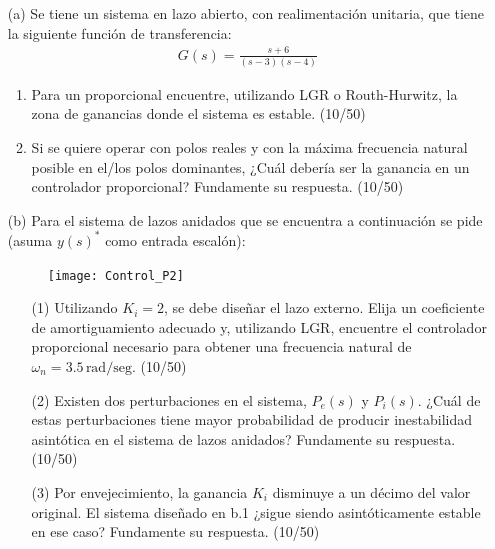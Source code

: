 \documentclass[
  11pt,
  letterpaper,
   addpoints,
  ]{exam}
\begin{document}
\begin{questions}
\begin{solution}
\end{solution}
    \question 
    \begin{itemize}
        \item[(a)] Se tiene un sistema en lazo abierto, con realimentación unitaria, que tiene la siguiente función de transferencia:
        \begin{align}
            G(s) = \frac{s + 6}{(s - 3)(s - 4)}
        \end{align}
        \begin{enumerate}
            \item Para un proporcional encuentre, utilizando LGR o Routh-Hurwitz, la zona de ganancias donde el sistema es estable. (10/50)
            \item Si se quiere operar con polos reales y con la máxima frecuencia natural posible en el/los polos dominantes, ¿Cuál debería ser la ganancia en un controlador proporcional? Fundamente su respuesta. (10/50)
        \end{enumerate}
        \item[(b)] Para el sistema de lazos anidados que se encuentra a continuación se pide (asuma \(y(s)^*\) como entrada escalón):
        \begin{figure}[h!]
            \centering
            \texttt{[image: Control\_P2]}
        \end{figure}
        \begin{enumerate}
            \item[(1)] Utilizando \(K_i = 2\), se debe diseñar el lazo externo. Elija un coeficiente de amortiguamiento adecuado y, utilizando LGR, encuentre el controlador proporcional necesario para obtener una frecuencia natural de \(\omega_n = 3.5 \, \text{rad/seg}\). (10/50)
            \item[(2)] Existen dos perturbaciones en el sistema, \(P_e(s)\) y \(P_i(s)\). ¿Cuál de estas perturbaciones tiene mayor probabilidad de producir inestabilidad asintótica en el sistema de lazos anidados? Fundamente su respuesta. (10/50)
            \item[(3)] Por envejecimiento, la ganancia \(K_i\) disminuye a un décimo del valor original. El sistema diseñado en b.1 ¿sigue siendo asintóticamente estable en ese caso? Fundamente su respuesta. (10/50)
        \end{enumerate}
    \end{itemize}
    
\begin{solution}

\end{solution}
\end{questions}
\end{document}
